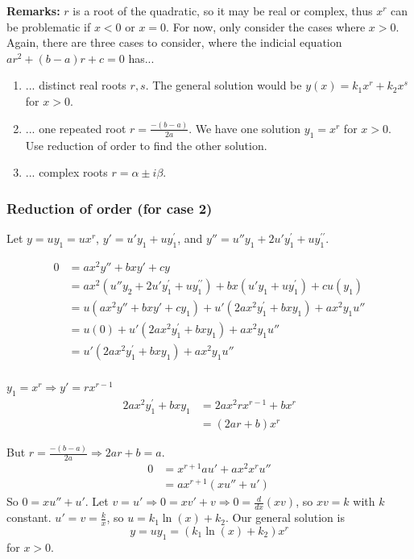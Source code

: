 \documentclass[11pt]{article}
\newcommand{\yp}{y^{\prime}}
\newcommand{\ypp}{y^{\prime\prime}}
\begin{document}
	\textbf{Remarks:} $r$ is a root of the quadratic, so it may be real or complex, thus $x^r$ can be problematic if $x < 0$ or $x = 0$. For now, only consider the cases where $x > 0$. Again, there are three cases to consider, where the indicial equation $a r^2 + (b-a) r + c = 0$ has...
		\begin{enumerate}
			\item ... distinct real roots $r,s$. The general solution would be $y(x) = k_1 x^r + k_2 x^s$ for $x > 0$.
			\item ... one repeated root $r = \frac{-(b-a)}{2a}$. We have one solution $y_1 = x^r$ for $x > 0$. Use reduction of order to find the other solution.
			\item ... complex roots $r = \alpha \pm i \beta$.
		\end{enumerate}

\subsubsection{Reduction of order (for case 2)}
	Let $y = u y_1 = u x^r$, $y' = u' y_1 + u \yp_1$, and $y'' = u'' y_1 + 2 u' \yp_1 + u \ypp_1$.

	\begin{align*}
		0 &= ax^2 y'' + b x y' + cy \\
			&= a x^2 (u'' y_2 + 2u' \yp_1 + u \ypp_1) + bx(u' y_1 + u \yp_1) + cu(y_1) \\
			&= u (ax^2y'' + bxy' + cy_1) + u' (2ax^2 \yp_1 + bxy_1) + ax^2 y_1 u'' \\
			&= u (0) + u' (2ax^2 \yp_1 + bxy_1) + ax^2 y_1 u'' \\
			&= u' (2ax^2 \yp_1 + bxy_1) + ax^2 y_1 u'' \\
	\end{align*}

	$y_1 = x^r \Rightarrow y' = r x^{r-1} $
	\begin{align*}
		2ax^2 \yp_1 + bxy_1 &= 2ax^2rx^{r-1} + bx^r \\
			&= (2ar + b)x^r
	\end{align*}

	But $r = \frac{-(b-a)}{2a} \Rightarrow 2ar + b = a$.
	\begin{align*}
		0 &= x^{r+1} a u' + a x^2 x^r u'' \\
			&= ax^{r+1} (x u'' + u')
	\end{align*}
	So $0 = xu'' + u'$. Let $v = u' \Rightarrow 0 = xv' + v \Rightarrow 0 = \frac{d}{dx} (xv)$, so $xv = k$ with $k$ constant. $u' = v = \frac{k}{x}$, so $u = k_1 \ln(x) + k_2$. Our general solution is
		$$ y = u y_1 = (k_1 \ln(x) + k_2) x^r $$
	for $x > 0$.
\end{document}
